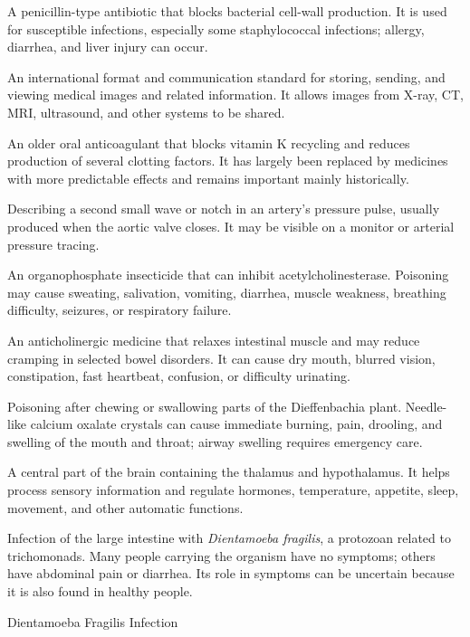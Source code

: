  A penicillin-type antibiotic that blocks bacterial cell-wall production. It is used for susceptible infections, especially some staphylococcal infections; allergy, diarrhea, and liver injury can occur.

 An international format and communication standard for storing, sending, and viewing medical images and related information. It allows images from X-ray, CT, MRI, ultrasound, and other systems to be shared.

 An older oral anticoagulant that blocks vitamin K recycling and reduces production of several clotting factors. It has largely been replaced by medicines with more predictable effects and remains important mainly historically.

 Describing a second small wave or notch in an artery's pressure pulse, usually produced when the aortic valve closes. It may be visible on a monitor or arterial pressure tracing.

 An organophosphate insecticide that can inhibit acetylcholinesterase. Poisoning may cause sweating, salivation, vomiting, diarrhea, muscle weakness, breathing difficulty, seizures, or respiratory failure.

 An anticholinergic medicine that relaxes intestinal muscle and may reduce cramping in selected bowel disorders. It can cause dry mouth, blurred vision, constipation, fast heartbeat, confusion, or difficulty urinating.

 Poisoning after chewing or swallowing parts of the Dieffenbachia plant. Needle-like calcium oxalate crystals can cause immediate burning, pain, drooling, and swelling of the mouth and throat; airway swelling requires emergency care.

 A central part of the brain containing the thalamus and hypothalamus. It helps process sensory information and regulate hormones, temperature, appetite, sleep, movement, and other automatic functions.

 Infection of the large intestine with \textit{Dientamoeba fragilis}, a protozoan related to trichomonads. Many people carrying the organism have no symptoms; others have abdominal pain or diarrhea. Its role in symptoms can be uncertain because it is also found in healthy people.

\synonyms
Dientamoeba Fragilis Infection

